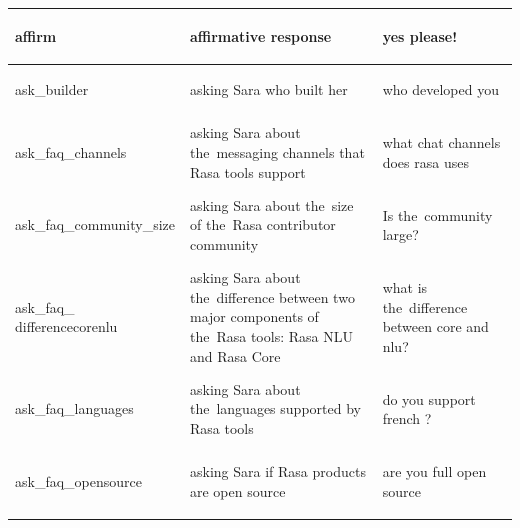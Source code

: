 \documentclass[bsc,frontabs,singlespacing,parskip,deptreport]{infthesis}
\begin{document}
{\begin{center}
\begin{longtable}{p{}|p{}|p{}}
    \begin{spverbatim}affirm\end{spverbatim} & affirmative response & \begin{spverbatim}yes please!\end{spverbatim} \\
    \hline
    \begin{spverbatim}ask_builder\end{spverbatim} & asking Sara who built her & \begin{spverbatim}who developed you\end{spverbatim} \\
    \hline
    \begin{spverbatim}ask_faq_channels\end{spverbatim} & asking Sara about the~messaging channels that Rasa tools support & \begin{spverbatim}what chat channels does rasa uses\end{spverbatim} \\
    \hline
    \begin{spverbatim}ask_faq_community_size\end{spverbatim} & asking Sara about the~size of the~Rasa contributor community & \begin{spverbatim}Is the~community large?\end{spverbatim} \\
    \hline
    \begin{spverbatim}ask_faq_
    differencecorenlu\end{spverbatim} & asking Sara about the~difference between two major components of the~Rasa tools: Rasa NLU and Rasa Core & \begin{spverbatim}what is the~difference between core and nlu?\end{spverbatim} \\
    \hline
    \begin{spverbatim}ask_faq_languages\end{spverbatim} & asking Sara about the~languages supported by Rasa tools & \begin{spverbatim}do you support french ?\end{spverbatim} \\
    \hline
    \begin{spverbatim}ask_faq_opensource\end{spverbatim} & asking Sara if Rasa products are open source & \begin{spverbatim}are you full open source\end{spverbatim} \\

\end{longtable}
\end{center}}
\end{document}

